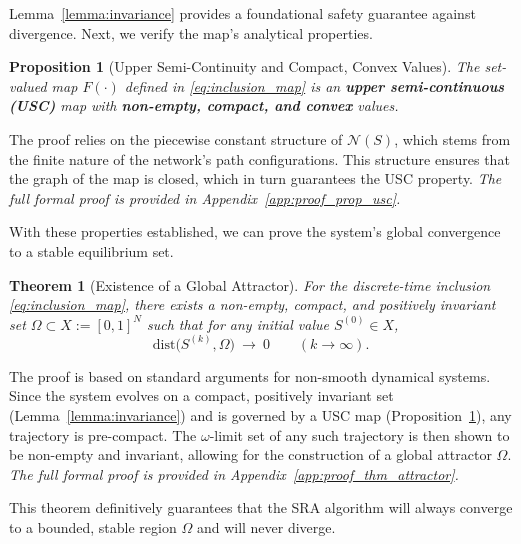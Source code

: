 \documentclass[journal]{IEEEtran}
\newtheorem{theorem}{Theorem}
\newtheorem{proposition}{Proposition}
\begin{document}
Lemma~\ref{lemma:invariance} provides a foundational safety guarantee against divergence. Next, we verify the map's analytical properties.

\begin{proposition}[Upper Semi-Continuity and Compact, Convex Values]
\label{prop:usc}
The set-valued map $F(\cdot)$ defined in \eqref{eq:inclusion_map} is an \textbf{upper semi-continuous (USC)} map with \textbf{non-empty, compact, and convex} values.
\end{proposition}
\begin{IEEEproof}
The proof relies on the piecewise constant structure of $\mathcal{N}(S)$, which stems from the finite nature of the network's path configurations. This structure ensures that the graph of the map is closed, which in turn guarantees the USC property. \textit{The full formal proof is provided in Appendix~\ref{app:proof_prop_usc}.}
\end{IEEEproof}

With these properties established, we can prove the system's global convergence to a stable equilibrium set.

\begin{theorem}[Existence of a Global Attractor]
\label{thm:attractor}
For the discrete-time inclusion \eqref{eq:inclusion_map}, there exists a non-empty, compact, and positively invariant set $\Omega\subset X:=[0,1]^N$ such that for any initial value $S^{(0)}\in X$,
\begin{equation}\label{eq:attractor_convergence}
\mathrm{dist}\big(S^{(k)},\Omega\big)\ \to\ 0\qquad (k\to\infty).
\end{equation}
\end{theorem}
\begin{IEEEproof}
The proof is based on standard arguments for non-smooth dynamical systems. Since the system evolves on a compact, positively invariant set (Lemma~\ref{lemma:invariance}) and is governed by a USC map (Proposition~\ref{prop:usc}), any trajectory is pre-compact. The $\omega$-limit set of any such trajectory is then shown to be non-empty and invariant, allowing for the construction of a global attractor $\Omega$. \textit{The full formal proof is provided in Appendix~\ref{app:proof_thm_attractor}.}
\end{IEEEproof}

This theorem definitively guarantees that the SRA algorithm will always converge to a bounded, stable region $\Omega$ and will never diverge.
\end{document}
